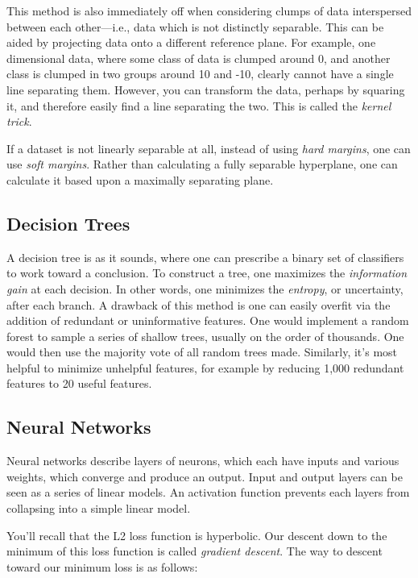 This method is also immediately off when considering clumps of data interspersed between each other---i.e., data which is not distinctly separable. This can be aided by projecting data onto a different reference plane. For example, one dimensional data, where some class of data is clumped around 0, and another class is clumped in two groups around 10 and -10, clearly cannot have a single line separating them. However, you can transform the data, perhaps by squaring it, and therefore easily find a line separating the two. This is called the \textit{kernel trick}. \newline

If a dataset is not linearly separable at all, instead of using \textit{hard margins}, one can use \textit{soft margins}. Rather than calculating a fully separable hyperplane, one can calculate it based upon a maximally separating plane. 


\subsection{Decision Trees}

A decision tree is as it sounds, where one can prescribe a binary set of classifiers to work toward a conclusion. To construct a tree, one maximizes the \textit{information gain} at each decision. In other words, one minimizes the \textit{entropy}, or uncertainty, after each branch. A drawback of this method is one can easily overfit via the addition of redundant or uninformative features. One would implement a random forest to sample a series of shallow trees, usually on the order of thousands. One would then use the majority vote of all random trees made. Similarly, it's most helpful to minimize unhelpful features, for example by reducing 1,000 redundant features to 20 useful features. 



\subsection{Neural Networks}

Neural networks describe layers of neurons, which each have inputs and various weights, which converge and produce an output. Input and output layers can be seen as a series of linear models. An activation function prevents each layers from collapsing into a simple linear model.\newline

You'll recall that the L2 loss function is hyperbolic. Our descent down to the minimum of this loss function is called \textit{gradient descent}. The way to descent toward our minimum loss is as follows: 

